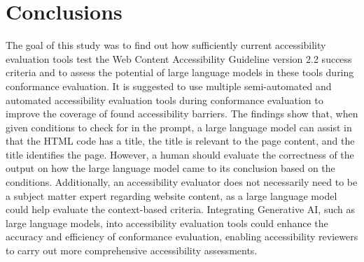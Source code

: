 \chapter{Conclusions\label{conclusions}}

The goal of this study was to find out how sufficiently current accessibility evaluation tools test the Web Content Accessibility Guideline version 2.2 success criteria and to assess the potential of large language models in these tools during conformance evaluation. It is suggested to use multiple semi-automated and automated accessibility evaluation tools during conformance evaluation to improve the coverage of found accessibility barriers. The findings show that, when given conditions to check for in the prompt, a large language model can assist in that the HTML code has a title, the title is relevant to the page content, and the title identifies the page. However, a human should evaluate the correctness of the output on how the large language model came to its conclusion based on the conditions. Additionally, an accessibility evaluator does not necessarily need to be a subject matter expert regarding website content, as a large language model could help evaluate the context-based criteria. Integrating Generative AI, such as large language models, into accessibility evaluation tools could enhance the accuracy and efficiency of conformance evaluation, enabling accessibility reviewers to carry out more comprehensive accessibility assessments.

